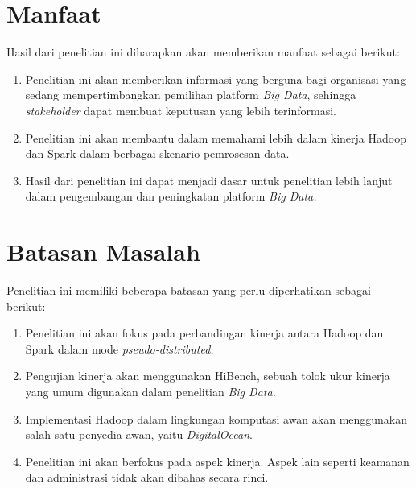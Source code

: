 \section{Manfaat}
Hasil dari penelitian ini diharapkan akan memberikan manfaat sebagai berikut:
\begin{enumerate}
	\item 
	Penelitian ini akan memberikan informasi yang berguna bagi organisasi yang sedang mempertimbangkan pemilihan platform \textit{Big Data}, sehingga \textit{stakeholder} dapat membuat keputusan yang lebih terinformasi.	
	\item
	Penelitian ini akan membantu dalam memahami lebih dalam kinerja Hadoop dan Spark dalam berbagai skenario pemrosesan data.
	\item
	Hasil dari penelitian ini dapat menjadi dasar untuk penelitian lebih lanjut dalam pengembangan dan peningkatan platform \textit{Big Data.}
\end{enumerate}

\section{Batasan Masalah}
Penelitian ini memiliki beberapa batasan yang perlu diperhatikan sebagai berikut:
	\begin{enumerate}
		\item 
		Penelitian ini akan fokus pada perbandingan kinerja antara Hadoop dan Spark dalam mode \textit{pseudo-distributed.}
		\item
		Pengujian kinerja akan menggunakan HiBench, sebuah tolok ukur kinerja yang umum digunakan dalam penelitian \textit{Big Data.}
		\item
		Implementasi Hadoop dalam lingkungan komputasi awan akan menggunakan salah satu penyedia awan, yaitu \textit{DigitalOcean}.
		\item
		Penelitian ini akan berfokus pada aspek kinerja. Aspek lain seperti keamanan dan administrasi tidak akan dibahas secara rinci.
	\end{enumerate}

%
%
%
